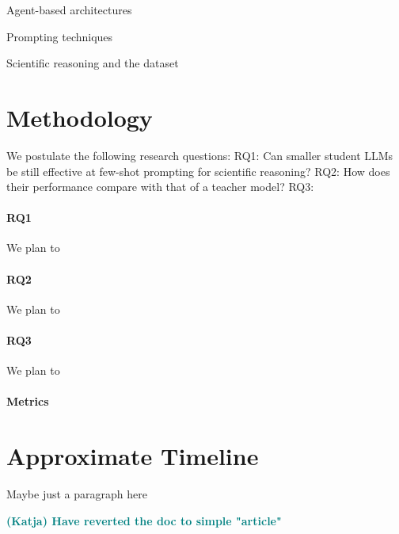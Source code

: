 \documentclass{article}
\newcommand{\katja}[1]{\textbf{\textcolor{teal}{(Katja) #1}}}
\begin{document}
Agent-based architectures \cite{lin2024swiftsage} \cite{ghafarollahi2024sciagents}

Prompting techniques \cite{schulhoff2024prompt}

Scientific reasoning and the dataset \cite{lu2022learn}

\section{Methodology}
We postulate the following research questions: 
RQ1: Can smaller student LLMs be still effective at few-shot prompting for scientific reasoning?
RQ2: How does their performance compare with that of a teacher model?
RQ3: 
\paragraph{RQ1} 
We plan to 

\paragraph{RQ2}
We plan to

\paragraph{RQ3}
We plan to

\paragraph{Metrics}

\section{Approximate Timeline}
Maybe just a paragraph here


\katja{Have reverted the doc to simple "article"}



\end{document}
